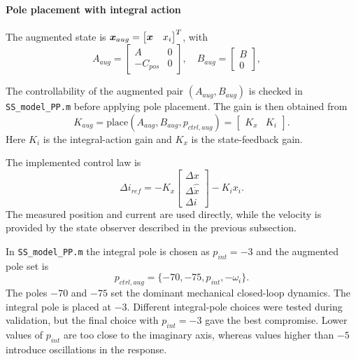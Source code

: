 \paragraph{Pole placement with integral action}
The augmented state is $\boldsymbol{x}_{aug} = \begin{bmatrix} \boldsymbol{x} & x_i \end{bmatrix}^T$, with
\begin{equation}
    A_{aug} =
    \begin{bmatrix}
        A & 0 \\
        -C_{pos} & 0
    \end{bmatrix},
    \quad
    B_{aug} =
    \begin{bmatrix}
        B \\
        0
    \end{bmatrix},
    \quad
\end{equation}


The controllability of the augmented pair $(A_{aug},B_{aug})$ is checked in
\texttt{SS\_model\_PP.m} before applying pole placement. The gain is then obtained from
\begin{equation}
    K_{aug} = \mathrm{place}(A_{aug}, B_{aug}, p_{ctrl,aug})
    =
    \begin{bmatrix}
        K_x & K_i
    \end{bmatrix}.
\end{equation}
Here $K_i$ is the integral-action gain and $K_x$ is the state-feedback gain.


The implemented control law is
\begin{equation}
    \Delta i_{ref}
    =
    -K_x
    \begin{bmatrix}
        \Delta x\\
        \Delta\hat{\dot{x}}\\
        \Delta i
    \end{bmatrix}
    -K_i x_i.
\end{equation}
The measured position and current are used directly, while the velocity is provided by the state
observer described in the previous subsection.

In \texttt{SS\_model\_PP.m} the integral pole is chosen as $p_{int} = -3$ and the augmented pole set is
\begin{equation}
    p_{ctrl,aug} = \{-70, -75, p_{int}, -\omega_i\}.
\end{equation}
The poles $-70$ and $-75$ set the dominant mechanical closed-loop dynamics. The integral pole is placed
at $-3$. Different integral-pole choices were tested during validation, but the final
choice with $p_{int}=-3$ gave the best compromise.
Lower values of $p_{int}$ are too close to the imaginary axis, whereas values higher than $-5$
introduce oscillations in the response.

